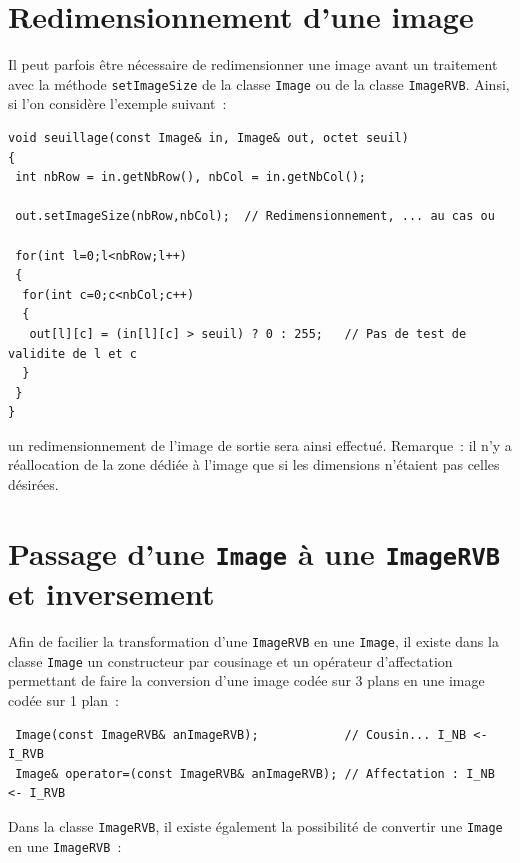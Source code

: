 \documentclass[12pt]{article}
\begin{document}
\section{Redimensionnement d'une image}

Il peut parfois \^etre n\'ecessaire de redimensionner
une image avant un traitement avec la m\'ethode
{\tt setImageSize} de la classe {\tt Image} ou de la
classe {\tt ImageRVB}.
Ainsi, si l'on consid\`ere l'exemple suivant~:

\begin{footnotesize}
\begin{verbatim}
void seuillage(const Image& in, Image& out, octet seuil)
{
 int nbRow = in.getNbRow(), nbCol = in.getNbCol();

 out.setImageSize(nbRow,nbCol);  // Redimensionnement, ... au cas ou

 for(int l=0;l<nbRow;l++)
 {
  for(int c=0;c<nbCol;c++)
  {
   out[l][c] = (in[l][c] > seuil) ? 0 : 255;   // Pas de test de validite de l et c
  }
 }
}
\end{verbatim}
\end{footnotesize}

un redimensionnement de l'image de sortie sera ainsi effectu\'e.
Remarque~: il n'y a r\'eallocation de la zone d\'edi\'ee \`a l'image
que si les dimensions n'\'etaient pas celles d\'esir\'ees.

\section{Passage d'une {\tt Image} \`a une {\tt ImageRVB} et inversement}

Afin de facilier la transformation d'une {\tt ImageRVB} en une {\tt Image},
il existe dans la classe {\tt Image} un constructeur par cousinage et
un op\'erateur d'affectation permettant de faire la conversion d'une image
cod\'ee sur 3 plans en une image cod\'ee sur 1 plan~:

\begin{footnotesize}
\begin{verbatim}
 Image(const ImageRVB& anImageRVB);            // Cousin... I_NB <- I_RVB
 Image& operator=(const ImageRVB& anImageRVB); // Affectation : I_NB <- I_RVB
\end{verbatim}
\end{footnotesize}

Dans la classe {\tt ImageRVB}, il existe \'egalement la possibilit\'e
de convertir une {\tt Image} en une {\tt ImageRVB}~:
\end{document}
